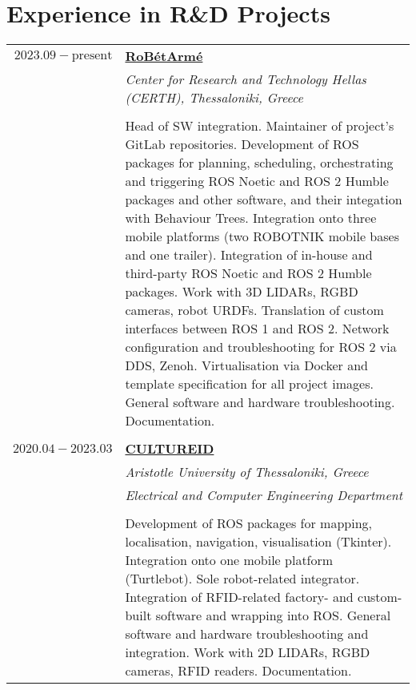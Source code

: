 \documentclass[a4paper,10pt,twoside]{article}
\begin{document}
\vspace*{\fill}
\newpage


\vspace*{\fill}
\section{Experience in R\&D Projects}

\begin{tabular}{rp{11cm}}
$2023.09 - \text{present}$ & \href{https://www.robetarme-project.eu/}{\textbf{RoBétArmé}} \\
                           & \textit{Center for Research and Technology Hellas (CERTH), Thessaloniki, Greece}\\
\\
                           & Head of SW integration. Maintainer of project's GitLab repositories. Development of ROS packages for planning, scheduling, orchestrating and triggering ROS Noetic and ROS 2 Humble packages and other software, and their integation with Behaviour Trees. Integration onto three mobile platforms (two ROBOTNIK mobile bases and one trailer). Integration of in-house and third-party ROS Noetic and ROS 2 Humble packages. Work with 3D LIDARs, RGBD cameras, robot URDFs. Translation of custom interfaces between ROS 1 and ROS 2. Network configuration and troubleshooting for ROS 2 via DDS, Zenoh. Virtualisation via Docker and template specification for all project images. General software and hardware troubleshooting. Documentation. \\
&\\
$2020.04 - 2023.03$ & \href{https://cultureid.web.auth.gr/?page\_id=216\&lang=en}{\textbf{CULTUREID}} \\
                    & \textit{Aristotle University of Thessaloniki, Greece}\\
                    & \textit{Electrical and Computer Engineering Department} \\
\\
                    & Development of ROS packages for mapping, localisation, navigation, visualisation (Tkinter). Integration onto one mobile platform (Turtlebot). Sole robot-related integrator. Integration of RFID-related factory- and custom-built software and wrapping into ROS. General software and hardware troubleshooting and integration. Work with 2D LIDARs, RGBD cameras, RFID readers. Documentation. \\

\end{tabular}
\end{document}

